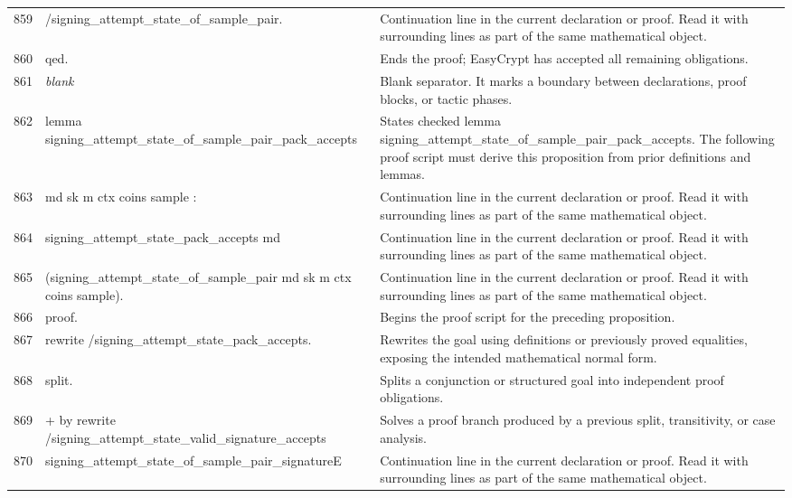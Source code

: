 \documentclass[10pt]{article}
\begin{document}
\begin{longtable}{r L{0.53\textwidth} L{0.37\textwidth}}
859 & {\ttfamily\scriptsize            /signing\_attempt\_state\_of\_sample\_pair.} & Continuation line in the current declaration or proof.  Read it with surrounding lines as part of the same mathematical object. \\
860 & {\ttfamily\scriptsize qed.} & Ends the proof; EasyCrypt has accepted all remaining obligations. \\
861 & {\ttfamily\scriptsize \emph{blank}} & Blank separator.  It marks a boundary between declarations, proof blocks, or tactic phases. \\
862 & {\ttfamily\scriptsize lemma signing\_attempt\_state\_of\_sample\_pair\_pack\_accepts} & States checked lemma signing\_attempt\_state\_of\_sample\_pair\_pack\_accepts.  The following proof script must derive this proposition from prior definitions and lemmas. \\
863 & {\ttfamily\scriptsize   md sk m ctx coins sample :} & Continuation line in the current declaration or proof.  Read it with surrounding lines as part of the same mathematical object. \\
864 & {\ttfamily\scriptsize   signing\_attempt\_state\_pack\_accepts md} & Continuation line in the current declaration or proof.  Read it with surrounding lines as part of the same mathematical object. \\
865 & {\ttfamily\scriptsize     (signing\_attempt\_state\_of\_sample\_pair md sk m ctx coins sample).} & Continuation line in the current declaration or proof.  Read it with surrounding lines as part of the same mathematical object. \\
866 & {\ttfamily\scriptsize proof.} & Begins the proof script for the preceding proposition. \\
867 & {\ttfamily\scriptsize rewrite /signing\_attempt\_state\_pack\_accepts.} & Rewrites the goal using definitions or previously proved equalities, exposing the intended mathematical normal form. \\
868 & {\ttfamily\scriptsize split.} & Splits a conjunction or structured goal into independent proof obligations. \\
869 & {\ttfamily\scriptsize + by rewrite /signing\_attempt\_state\_valid\_signature\_accepts} & Solves a proof branch produced by a previous split, transitivity, or case analysis. \\
870 & {\ttfamily\scriptsize              signing\_attempt\_state\_of\_sample\_pair\_signatureE} & Continuation line in the current declaration or proof.  Read it with surrounding lines as part of the same mathematical object. \\

\end{longtable}
\end{document}
